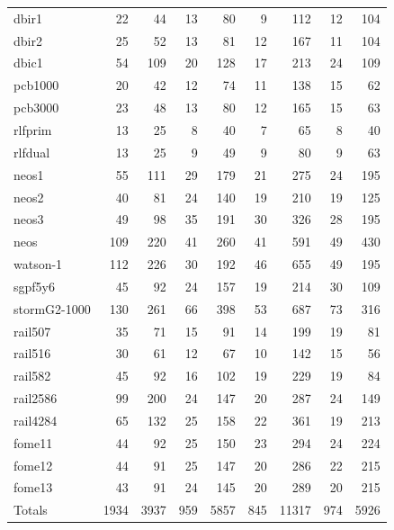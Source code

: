 \begin{small}
\begin{longtable}{|l|rr|rr|rr|rr|}
dbir1 & 22 & 44 & 13 & 80 & 9 & 112 & 12 & 104 \\
dbir2 & 25 & 52 & 13 & 81 & 12 & 167 & 11 & 104 \\
dbic1 & 54 & 109 & 20 & 128 & 17 & 213 & 24 & 109 \\
pcb1000 & 20 & 42 & 12 & 74 & 11 & 138 & 15 & 62 \\
pcb3000 & 23 & 48 & 13 & 80 & 12 & 165 & 15 & 63 \\
rlfprim & 13 & 25 & 8 & 40 & 7 & 65 & 8 & 40 \\
rlfdual & 13 & 25 & 9 & 49 & 9 & 80 & 9 & 63 \\
neos1 & 55 & 111 & 29 & 179 & 21 & 275 & 24 & 195 \\
neos2 & 40 & 81 & 24 & 140 & 19 & 210 & 19 & 125 \\
neos3 & 49 & 98 & 35 & 191 & 30 & 326 & 28 & 195 \\
neos & 109 & 220 & 41 & 260 & 41 & 591 & 49 & 430 \\
watson-1 & 112 & 226 & 30 & 192 & 46 & 655 & 49 & 195 \\
sgpf5y6 & 45 & 92 & 24 & 157 & 19 & 214 & 30 & 109 \\
stormG2-1000 & 130 & 261 & 66 & 398 & 53 & 687 & 73 & 316 \\
rail507 & 35 & 71 & 15 & 91 & 14 & 199 & 19 & 81 \\
rail516 & 30 & 61 & 12 & 67 & 10 & 142 & 15 & 56 \\
rail582 & 45 & 92 & 16 & 102 & 19 & 229 & 19 & 84 \\
rail2586 & 99 & 200 & 24 & 147 & 20 & 287 & 24 & 149 \\
rail4284 & 65 & 132 & 25 & 158 & 22 & 361 & 19 & 213 \\
fome11 & 44 & 92 & 25 & 150 & 23 & 294 & 24 & 224 \\
fome12 & 44 & 91 & 25 & 147 & 20 & 286 & 22 & 215 \\
fome13 & 43 & 91 & 24 & 145 & 20 & 289 & 20 & 215 \\ \hline
   Totals & 1934 & 3937 & 959 & 5857 & 845 & 11317 & 974 & 5926
\end{longtable} 
\end{small}
